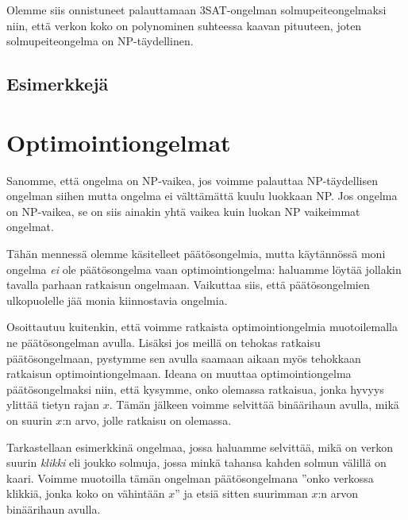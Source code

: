 Olemme siis onnistuneet palauttamaan 3SAT-ongelman solmupeiteongelmaksi
niin, että verkon koko on polynominen suhteessa kaavan pituuteen,
joten solmupeiteongelma on NP-täydellinen.

\subsection{Esimerkkejä}

\section{Optimointiongelmat}

Sanomme, että ongelma on NP-vaikea, jos voimme palauttaa
NP-täydellisen ongelman siihen mutta ongelma ei välttämättä
kuulu luokkaan NP.
Jos ongelma on NP-vaikea, se on siis ainakin yhtä vaikea
kuin luokan NP vaikeimmat ongelmat.

Tähän mennessä olemme käsitelleet päätösongelmia,
mutta käytännössä moni ongelma \emph{ei} ole päätösongelma
vaan optimointiongelma: haluamme löytää jollakin
tavalla parhaan ratkaisun ongelmaan.
Vaikuttaa siis, että päätöson\-gelmien ulkopuolelle jää
monia kiinnostavia ongelmia.

Osoittautuu kuitenkin, että voimme ratkaista optimointiongelmia
muotoilemalla ne päätösongelman avulla.
Lisäksi jos meillä on tehokas ratkaisu päätösongelmaan,
pystymme sen avulla saamaan aikaan myös tehokkaan
ratkaisun optimointiongelmaan.
Ideana on muuttaa optimointiongelma päätös\-ongelmaksi niin,
että kysymme, onko olemassa ratkaisua, jonka hyvyys ylittää
tietyn rajan $x$. Tämän jälkeen voimme selvittää binäärihaun
avulla, mikä on suurin $x$:n arvo, jolle ratkaisu on olemassa.

Tarkastellaan esimerkkinä ongelmaa, jossa haluamme selvittää,
mikä on verkon suurin \emph{klikki} eli joukko solmuja,
jossa minkä tahansa kahden solmun välillä on kaari.
Voimme muotoilla tämän ongelman päätösongelmana
''onko verkossa klikkiä, jonka koko on vähintään $x$''
ja etsiä sitten suurimman $x$:n arvon binäärihaun avulla.